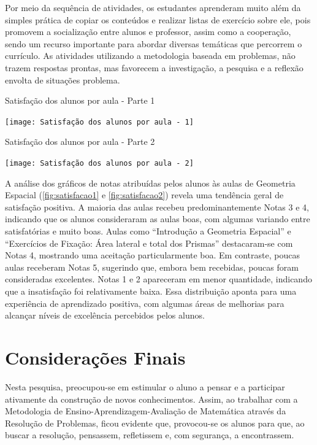 Por meio da sequência de atividades, os estudantes aprenderam muito além da simples prática de copiar os conteúdos e realizar listas de exercício sobre ele, pois promovem a socialização entre alunos e professor, assim como a cooperação, sendo um recurso importante para abordar diversas temáticas que percorrem o currículo. As atividades utilizando a metodologia baseada em problemas, não trazem respostas prontas, mas favorecem a investigação, a pesquisa e a reflexão envolta de situações problema.

\begin{CenteredFigure}
    \caption{Satisfação dos alunos por aula - Parte 1} \label{fig:satisfacao1}
    \texttt{[image: Satisfação dos alunos por aula - 1]}
    \legend{\autoria}
\end{CenteredFigure}

\begin{CenteredFigure}
    \caption{Satisfação dos alunos por aula - Parte 2} \label{fig:satisfacao2}
    \texttt{[image: Satisfação dos alunos por aula - 2]}
    \legend{\autoria}
\end{CenteredFigure}

A análise dos gráficos de notas atribuídas pelos alunos às aulas de Geometria Espacial (\autoref{fig:satisfacao1} e \autoref{fig:satisfacao2}) revela uma tendência geral de satisfação positiva. A maioria das aulas recebeu predominantemente Notas 3 e 4, indicando que os alunos consideraram as aulas boas, com algumas variando entre satisfatórias e muito boas. Aulas como ``Introdução a Geometria Espacial'' e ``Exercícios de Fixação: Área lateral e total dos Prismas'' destacaram-se com Notas 4, mostrando uma aceitação particularmente boa. Em contraste, poucas aulas receberam Notas 5, sugerindo que, embora bem recebidas, poucas foram consideradas excelentes. Notas 1 e 2 apareceram em menor quantidade, indicando que a insatisfação foi relativamente baixa. Essa distribuição aponta para uma experiência de aprendizado positiva, com algumas áreas de melhorias para alcançar níveis de excelência percebidos pelos alunos.

\chapter{Considerações Finais} \label{cap:5_consideracoes}

Nesta pesquisa, preocupou-se em estimular o aluno a pensar e a participar ativamente da construção de novos conhecimentos. Assim, ao trabalhar com a Metodologia de Ensino-Aprendizagem-Avaliação de Matemática através da Resolução de Problemas, ficou evidente que, provocou-se os alunos para que, ao buscar a resolução, pensassem, refletissem e, com segurança, a encontrassem.

